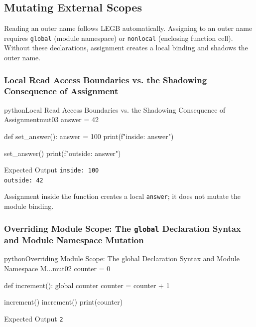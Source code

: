 \subsection{Mutating External Scopes}

Reading an outer name follows LEGB automatically. Assigning to an outer name requires \texttt{global} (module namespace) or \texttt{nonlocal} (enclosing function cell). Without these declarations, assignment creates a local binding and shadows the outer name.

\subsubsection{Local Read Access Boundaries vs. the Shadowing Consequence of Assignment}

\begin{codebox}[]{python}{Local Read Access Boundaries vs. the Shadowing Consequence of Assignment}{mut03}
answer = 42

def set_answer():
    answer = 100
    print(f"inside: {answer}")

set_answer()
print(f"outside: {answer}")
\end{codebox}


\begin{iobox}{Expected Output}
\texttt{inside: 100} \\
\texttt{outside: 42} \\
\end{iobox}




Assignment inside the function creates a local \texttt{answer}; it does not mutate the module binding.

\subsubsection{Overriding Module Scope: The \texttt{global} Declaration Syntax and Module Namespace Mutation}

\begin{codebox}[]{python}{Overriding Module Scope: The global Declaration Syntax and Module Namespace M...}{mut02}
counter = 0

def increment():
    global counter
    counter = counter + 1

increment()
increment()
print(counter)
\end{codebox}


\begin{iobox}{Expected Output}
\texttt{2} \\
\end{iobox}




